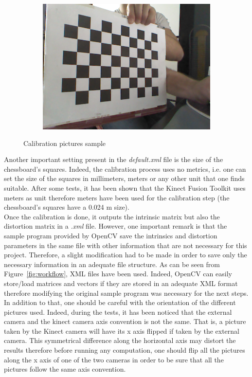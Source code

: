 \begin{figure}
\begin{subfigure}{.5\textwidth}
\end{subfigure}
\begin{subfigure}{.5\textwidth}
  \centering
  \includegraphics[width=0.8\linewidth]{images/calib4.png}
\end{subfigure}
\caption{Calibration pictures sample}
\label{fig:calibration pictures}
\end{figure}

Another important setting present in the \textit{default.xml} file is the size of the chessboard's squares. Indeed, the calibration process uses no metrics, i.e. one can set the size of the squares in millimeters, meters or any other unit that one finds suitable. After some tests, it has been shown that the Kinect Fusion Toolkit uses meters as unit therefore meters have been used for the calibration step (the chessboard's squares have a 0.024 m size).\\

Once the calibration is done, it outputs the intrinsic matrix but also the distortion matrix in a \textit{.xml} file. However, one important remark is that the sample program provided by OpenCV save the intrinsics and distortion parameters in the same file with other information that are not necessary for this project. Therefore, a slight modification had to be made in order to save only the necessary information in an adequate file structure. As can be seen from Figure~\ref{fig:workflow}, XML files have been used. Indeed, OpenCV can easily store/load matrices and vectors if they are stored in an adequate XML format therefore modifying the original sample program was necessary for the next steps. \\

In addition to that, one should be careful with the orientation of the different pictures used. Indeed, during the tests, it has been noticed that the external camera and the kinect camera axis convention is not the same. That is, a picture taken by the Kinect camera will have its x axis flipped if taken by the external camera. This symmetrical difference along the horizontal axis may distort the results therefore before running any computation, one should flip all the pictures along the x axis of one of the two cameras in order to be sure that all the pictures follow the same axis convention.\\


